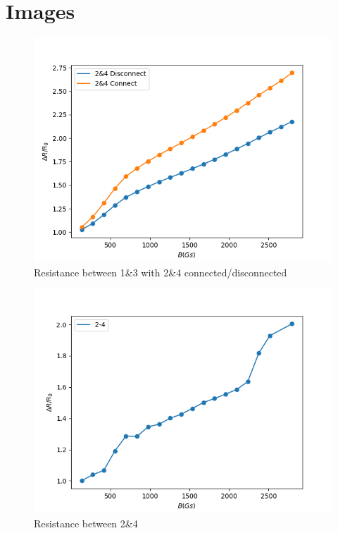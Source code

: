 \documentclass[a4paper]{article}
\begin{document}
\section*{Images}
\begin{figure}[H]
  \centering
  \includegraphics[width=0.6\linewidth]{./img/Fig.3.png}
  \caption{Resistance between 1\&3 with 2\&4 connected/disconnected}
  \label{fig:figure3}
\end{figure}
\begin{figure}[H]
  \centering
  \includegraphics[width=0.6\linewidth]{./img/Fig.4.png}
  \caption{Resistance between 2\&4}
  \label{fig:figure4}
\end{figure}
\end{document}
